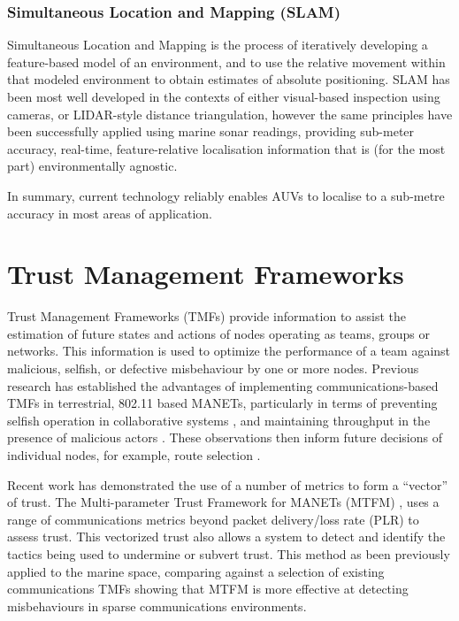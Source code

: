 \documentclass[conference,compsoc,letterpaper]{IEEEtran}
\begin{document}
\subsubsection{Simultaneous Location and Mapping (SLAM)}
Simultaneous Location and Mapping is the process of iteratively developing a feature-based model of an environment, and to use the relative movement within that modeled environment to obtain estimates of absolute positioning.
SLAM has been most well developed in the contexts of either visual-based inspection using cameras, or LIDAR-style distance triangulation, however the same principles have been successfully applied using marine sonar readings, providing sub-meter accuracy, real-time, feature-relative localisation information that is (for the most part) environmentally agnostic\cite{Williams2000}.

In summary, current technology reliably enables AUVs to localise to a sub-metre accuracy in most areas of application.

\section{Trust Management Frameworks}\label{sec:tmfs}

Trust Management Frameworks (TMFs) provide information to assist the estimation of future states and actions of nodes operating as teams, groups or networks. 
This information is used to optimize the performance of a team against malicious, selfish, or defective misbehaviour by one or more nodes.
Previous research has established the advantages of implementing communications-based TMFs in terrestrial, 802.11 based MANETs, particularly in terms of preventing selfish operation in collaborative systems \cite{Li2007}, and maintaining throughput in the presence of malicious actors \cite{Buchegger2002}. 
These observations then inform future decisions of individual nodes, for example, route selection \cite{Li2008}.

Recent work has demonstrated the use of a number of metrics to form a ``vector'' of trust. The Multi-parameter Trust Framework for MANETs (MTFM) \cite{Guo2012}, uses a range of communications metrics beyond packet delivery/loss rate (PLR) to assess trust. This vectorized trust also allows a system to detect and identify the tactics being used to undermine or subvert trust. 
This method as been previously applied to the marine space, comparing against a selection of existing communications TMFs \cite{Bolster2015} showing that MTFM is more effective at detecting misbehaviours in sparse communications environments. 
\end{document}
